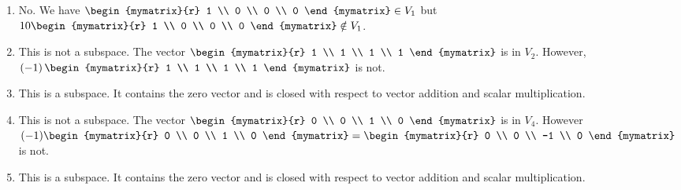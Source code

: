 \begin{enumialphparenastyle}
\begin{ex}
  \begin{sol}
    \begin{enumerate}
    \item
      No. We have $\begin{mymatrix}{r}
        1 \\ 0 \\ 0 \\ 0
      \end{mymatrix} \in V_1$ but $10\begin{mymatrix}{r}
        1 \\ 0 \\ 0 \\ 0
      \end{mymatrix} \notin V_1$.
    \item
      This is not a subspace. The vector $\begin{mymatrix}{r}
        1 \\ 1 \\ 1 \\ 1
      \end{mymatrix} $
      is in $V_2$. However, $\tup{-1} \begin{mymatrix}{r}
        1 \\ 1 \\ 1 \\ 1
      \end{mymatrix} $ is not.
    \item This is a subspace. It contains the zero vector and is
      closed with respect to vector addition and scalar
      multiplication.
    \item
      This
      is not a subspace. The vector $\begin{mymatrix}{r}
        0 \\ 0 \\ 1 \\ 0
      \end{mymatrix} $ is in $V_4$. However $(-1) \begin{mymatrix}{r}
        0 \\ 0 \\ 1 \\ 0
      \end{mymatrix}  = \begin{mymatrix}{r}
        0 \\ 0 \\ -1 \\ 0
      \end{mymatrix} $ is not.
    \item This is a subspace. It contains the zero vector and is
      closed with respect to vector addition and scalar
      multiplication.
    \end{enumerate}
  \end{sol}
\end{ex}


\end{enumialphparenastyle}
